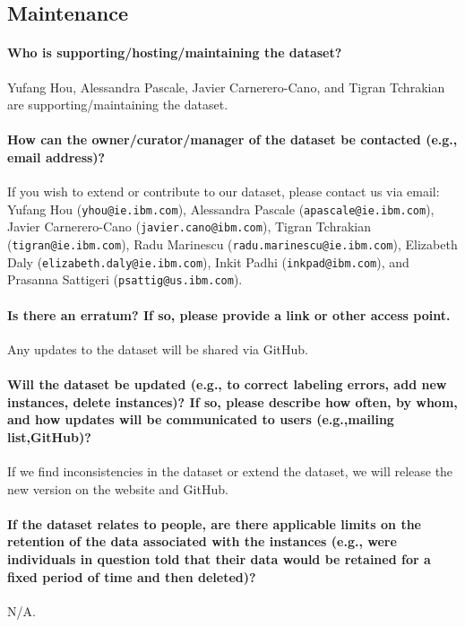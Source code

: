 \documentclass{article}
\begin{document}
\subsection{Maintenance}
\paragraph{Who is supporting/hosting/maintaining the dataset?}
Yufang Hou, Alessandra Pascale, Javier Carnerero-Cano, and Tigran Tchrakian are supporting/maintaining the dataset.

\paragraph{How can the owner/curator/manager of the dataset be contacted (e.g., email address)? }
If you wish to extend or contribute to our dataset, please contact us via email: Yufang Hou (\texttt{yhou@ie.ibm.com}), Alessandra Pascale (\texttt{apascale@ie.ibm.com}), Javier Carnerero-Cano (\texttt{javier.cano@ibm.com}), Tigran Tchrakian (\texttt{tigran@ie.ibm.com}), Radu Marinescu (\texttt{radu.marinescu@ie.ibm.com}), Elizabeth Daly (\texttt{elizabeth.daly@ie.ibm.com}), Inkit Padhi (\texttt{inkpad@ibm.com}), and Prasanna Sattigeri (\texttt{psattig@us.ibm.com}).




\paragraph{Is there an erratum? If so, please provide a link or other access point.}
Any updates to the dataset will be shared via GitHub.

\paragraph{Will the dataset be updated (e.g., to correct labeling errors, add new instances, delete instances)? If so, please describe how often, by whom, and how updates will be communicated to users (e.g.,mailing list,GitHub)?}
If we find inconsistencies in the dataset or extend the dataset, we will release the new version on the website and GitHub.

\paragraph{If the dataset relates to people, are there applicable limits on the retention of the data associated with the instances (e.g., were individuals in question told that their data would be retained for a fixed period of time and then deleted)? }
N/A.
\end{document}
